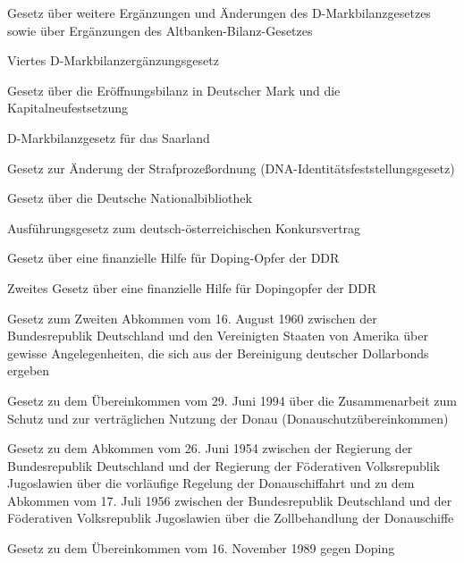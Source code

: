 \item[{DMBGErgG-3}] Gesetz über weitere Ergänzungen und Änderungen des D-Markbilanzgesetzes sowie über Ergänzungen des Altbanken-Bilanz-Gesetzes

\item[{DMBGErgG-4}] Viertes D-Markbilanzergänzungsgesetz

\item[{DMBilG}] Gesetz über die Eröffnungsbilanz in Deutscher Mark und die Kapitalneufestsetzung

\item[{DMBSaarG}] D-Markbilanzgesetz für das Saarland

\item[{DNA-IfG}] Gesetz zur Änderung der Strafprozeßordnung (DNA-Identitätsfeststellungsgesetz)

\item[{DNBG}] Gesetz über die Deutsche Nationalbibliothek

\item[{DöKVAG}] Ausführungsgesetz zum deutsch-österreichischen Konkursvertrag

\item[{DOHG}] Gesetz über eine finanzielle Hilfe für Doping-Opfer der DDR

\item[{DOHG-2}] Zweites Gesetz über eine finanzielle Hilfe für Dopingopfer der DDR

\item[{DollBBerAbk2G}] Gesetz zum Zweiten Abkommen vom 16. August 1960 zwischen der Bundesrepublik Deutschland und den Vereinigten Staaten von Amerika über gewisse Angelegenheiten, die sich aus der Bereinigung deutscher Dollarbonds ergeben

\item[{DonauSchÜbkG}] Gesetz zu dem Übereinkommen vom 29. Juni 1994 über die Zusammenarbeit zum Schutz und zur verträglichen Nutzung der Donau (Donauschutzübereinkommen)

\item[{DonauSchYUGAbkG}] Gesetz zu dem Abkommen vom 26. Juni 1954 zwischen der Regierung der Bundesrepublik Deutschland und der Regierung der Föderativen Volksrepublik Jugoslawien über die vorläufige Regelung der Donauschiffahrt und zu dem Abkommen vom 17. Juli 1956 zwischen der Bundesrepublik Deutschland und der Föderativen Volksrepublik Jugoslawien über die Zollbehandlung der Donauschiffe

\item[{DopingÜbkG}] Gesetz zu dem Übereinkommen vom 16. November 1989 gegen Doping

